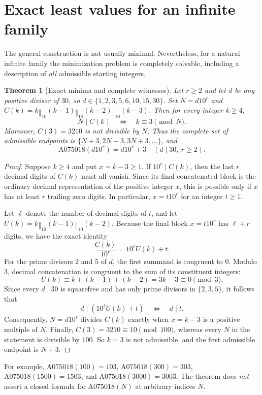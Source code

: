 \documentclass[10pt]{article}
\newtheorem{theorem}{Theorem}
\newcommand{\cat}{\mathbin{\Vert}}
\begin{document}
\section{Exact least values for an infinite family}\label{sec:minima}
The general construction is not usually minimal. Nevertheless, for
a natural infinite family the minimization problem is completely
solvable, including a description of \emph{all} admissible starting
integers.

\begin{theorem}[Exact minima and complete witnesses]\label{thm:minima}
Let $r\ge2$ and let $d$ be any positive divisor of $30$,
so $d\in\{1,2,3,5,6,10,15,30\}$. Set $N=d10^r$ and
$C(k)=k\cat_{10}(k-1)\cat_{10}(k-2)\cat_{10}(k-3)$.
Then for every integer $k\ge4$,
\[
 N\mid C(k)\quad\Longleftrightarrow\quad k\equiv3\pmod N.
\]
Moreover, $C(3)=3210$ is not divisible by $N$. Thus the complete
set of admissible endpoints is
$\{N+3,2N+3,3N+3,\ldots\}$, and
\[
 \boxed{\mathrm{A075018}(d10^r)=d10^r+3
 \quad(d\mid30,\ r\ge2).}
\]
\end{theorem}
\begin{proof}
Suppose $k\ge4$ and put $x=k-3\ge1$. If $10^r\mid C(k)$,
then the last $r$ decimal digits of $C(k)$ must all vanish.
Since its final concatenated block is the ordinary decimal
representation of the positive integer $x$, this is possible
only if $x$ has at least $r$ trailing zero digits. In particular,
$x=t10^r$ for an integer $t\ge1$.

Let $\ell$ denote the number of decimal digits of $t$, and let
$U(k)=k\cat_{10}(k-1)\cat_{10}(k-2)$. Because the final block
$x=t10^r$ has $\ell+r$ digits, we have the exact identity
\[
 \frac{C(k)}{10^r}=10^\ell U(k)+t.
\]
For the prime divisors $2$ and $5$ of $d$, the first summand
is congruent to $0$. Modulo $3$, decimal concatenation is
congruent to the sum of its constituent integers:
\[
 U(k)\equiv k+(k-1)+(k-2)=3k-3\equiv0\pmod3.
\]
Since every $d\mid30$ is squarefree and has only prime
divisors in $\{2,3,5\}$, it follows that
\[
 d\mid (10^\ell U(k)+t)\quad\Longleftrightarrow\quad d\mid t.
\]
Consequently, $N=d10^r$ divides $C(k)$ exactly when
$x=k-3$ is a positive multiple of $N$. Finally,
$C(3)=3210\equiv10\pmod{100}$, whereas every $N$ in the
statement is divisible by $100$. So $k=3$ is not admissible,
and the first admissible endpoint is $N+3$.
\end{proof}

For example, $\mathrm{A075018}(100)=103$,
$\mathrm{A075018}(300)=303$,
$\mathrm{A075018}(1500)=1503$, and
$\mathrm{A075018}(3000)=3003$.
The theorem does \emph{not} assert a closed formula for
$\mathrm{A075018}(N)$ at arbitrary indices $N$.
\end{document}
